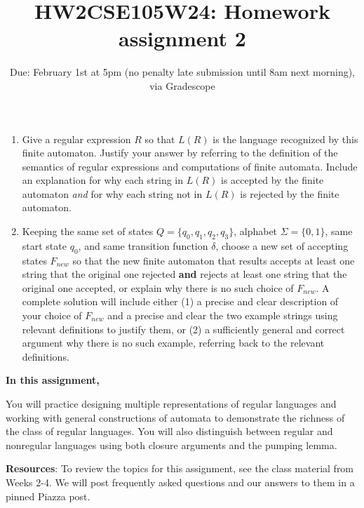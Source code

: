 \documentclass[12pt, oneside]{article}
\begin{document}
\begin{enumerate}[wide, labelwidth=!, labelindent=0pt]
\begin{enumerate}
    \item Give a regular expression $R$ so that $L(R)$ is the language 
    recognized by this finite automaton. Justify your answer by referring to the 
    definition of the semantics of regular expressions and computations of finite automata. 
    Include an explanation for why each string in $L(R)$ is accepted by the finite automaton {\it and}
    for why each string not in $L(R)$ is rejected by the finite automaton.

    \item  Keeping the same set of states $Q = \{q_0, q_1, q_2, q_3\}$, alphabet $\Sigma = \{0,1\}$, 
    same start state $q_0$, and same transition 
    function $\delta$, choose a new set of accepting states $F_{new}$ so that the new 
    finite automaton that results accepts at least one string that the original one rejected {\bf and} rejects
    at least one string that the original one accepted, or explain why there is no such choice of $F_{new}$.
    A complete solution will include either (1) a precise and
    clear description of your choice of $F_{new}$
    and a precise and clear the two example strings using relevant definitions 
    to justify them, or (2) a sufficiently general and correct argument
    why there is no such example, referring back to the relevant definitions.

    \end{enumerate}
    
    \end{enumerate}
\newpage

\title{HW2CSE105W24: Homework assignment 2}
\date{Due: February 1st at 5pm (no penalty late submission until 8am next morning), via Gradescope}



\maketitle
\thispagestyle{fancy}

{\bf In this assignment,}

You will practice designing multiple representations of regular languages and working with 
general constructions of automata to demonstrate the richness of the class of regular languages.
You will also distinguish between regular and nonregular languages using both closure arguments and the pumping lemma.


{\bf Resources}: To review the topics 
for this assignment, see the class material from Weeks 2-4.
We will post frequently asked questions and our answers to them in a 
pinned Piazza post.
\end{document}
